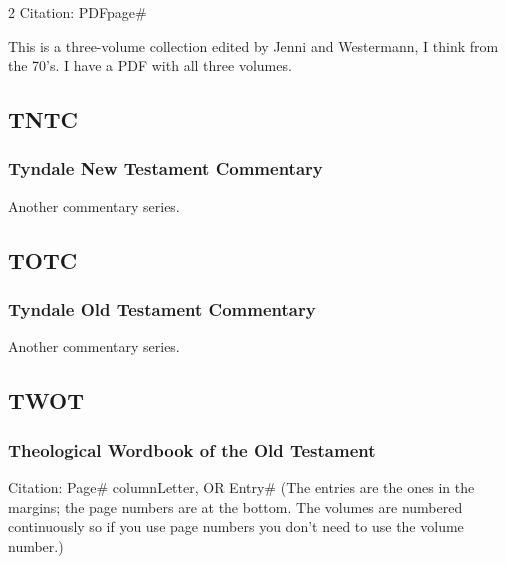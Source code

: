\begin{multicols}{2}
			Citation:
				PDFpage\#
		
			This is a three-volume collection edited by Jenni and Westermann, I think from the 70's. I have a PDF with all three volumes.
			
	\subsection*{TNTC}
	
		\subsubsection*{Tyndale New Testament Commentary}
		
			Another commentary series.
			
	\subsection*{TOTC}
	
		\subsubsection*{Tyndale Old Testament Commentary}
		
			Another commentary series.
		
	\subsection*{TWOT}
	
		\subsubsection*{Theological Wordbook of the Old Testament}
		
			Citation:
				Page\# columnLetter, OR
				Entry\#
				(The entries are the ones in the margins; the page numbers are at the bottom. The volumes are numbered continuously so if you use page numbers you don't need to use the volume number.)
		

\end{multicols}
